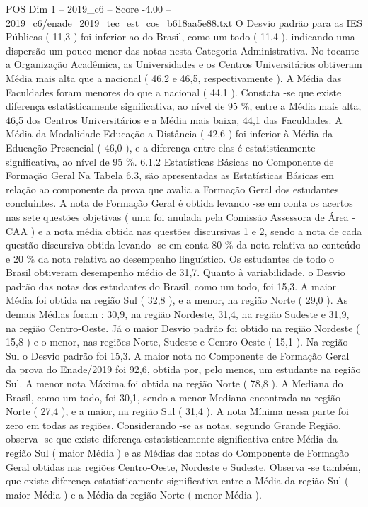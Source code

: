 \begin{textsample}{POS Dim 1 – 2019\_c6 – Score -4.00 – 2019\_c6/enade\_2019\_tec\_est\_cos\_b618aa5e88.txt}
O Desvio padrão para as IES Públicas ( 11,3 ) foi inferior ao do Brasil, como um todo ( 11,4 ), indicando uma dispersão um pouco menor das notas nesta Categoria Administrativa.
No tocante a Organização Acadêmica, as Universidades e os Centros Universitários obtiveram Média mais alta que a nacional ( 46,2 e 46,5, respectivamente ).
A Média das Faculdades foram menores do que a nacional ( 44,1 ).
Constata -se que existe diferença estatisticamente significativa, ao nível de 95 \%, entre a Média mais alta, 46,5 dos Centros Universitários e a Média mais baixa, 44,1 das Faculdades.
A Média da Modalidade Educação a Distância ( 42,6 ) foi inferior à Média da Educação Presencial ( 46,0 ), e a diferença entre elas é estatisticamente significativa, ao nível de 95 \%. 6.1.2 Estatísticas Básicas no Componente de Formação Geral Na Tabela 6.3, são apresentadas as Estatísticas Básicas em relação ao componente da prova que avalia a Formação Geral dos estudantes concluintes.
A nota de Formação Geral é obtida levando -se em conta os acertos nas sete questões objetivas ( uma foi anulada pela Comissão Assessora de Área - CAA ) e a nota média obtida nas questões discursivas 1 e 2, sendo a nota de cada questão discursiva obtida levando -se em conta 80 \% da nota relativa ao conteúdo e 20 \% da nota relativa ao desempenho linguístico.
Os estudantes de todo o Brasil obtiveram desempenho médio de 31,7.
Quanto à variabilidade, o Desvio padrão das notas dos estudantes do Brasil, como um todo, foi 15,3.
A maior Média foi obtida na região Sul ( 32,8 ), e a menor, na região Norte ( 29,0 ).
As demais Médias foram : 30,9, na região Nordeste, 31,4, na região Sudeste e 31,9, na região Centro-Oeste.
Já o maior Desvio padrão foi obtido na região Nordeste ( 15,8 ) e o menor, nas regiões Norte, Sudeste e Centro-Oeste ( 15,1 ).
Na região Sul o Desvio padrão foi 15,3.
A maior nota no Componente de Formação Geral da prova do Enade/2019 foi 92,6, obtida por, pelo menos, um estudante na região Sul.
A menor nota Máxima foi obtida na região Norte ( 78,8 ).
A Mediana do Brasil, como um todo, foi 30,1, sendo a menor Mediana encontrada na região Norte ( 27,4 ), e a maior, na região Sul ( 31,4 ).
A nota Mínima nessa parte foi zero em todas as regiões.
Considerando -se as notas, segundo Grande Região, observa -se que existe diferença estatisticamente significativa entre Média da região Sul ( maior Média ) e as Médias das notas do Componente de Formação Geral obtidas nas regiões Centro-Oeste, Nordeste e Sudeste.
Observa -se também, que existe diferença estatisticamente significativa entre a Média da região Sul ( maior Média ) e a Média da região Norte ( menor Média ).

\end{textsample}
